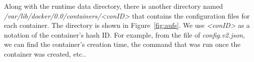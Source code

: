Along with the runtime data directory, there is another directory named \textit{/var/lib/docker/0.0/containers/<conID>} that contains the configuration files for each container. The directory is shown in Figure~\ref{fig:aufs}. We use \textit{<conID>} as a notation of the container's hash ID. For example, from the file of \textit{ config.v2.json}, we can find the container's creation time, the command that was run once the container was created, etc..



